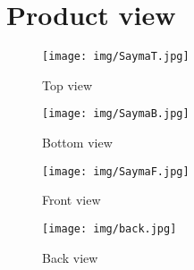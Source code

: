 
\section{Product view}	
	
	\begin{figure}[htbp!]
		\centering
		\texttt{[image: img/SaymaT.jpg]}\\
		\caption{Top view}
	\end{figure}
	
		\begin{figure}[htbp!]
			\centering
			\texttt{[image: img/SaymaB.jpg]}\\
			\caption{Bottom view}
		\end{figure}

		\begin{figure}[htbp!]
			\centering
			\texttt{[image: img/SaymaF.jpg]}\\
			\caption{Front view}
		\end{figure}
	
		\begin{figure}[htbp!]
			\centering
			\texttt{[image: img/back.jpg]}\\
			\caption{Back view}
		\end{figure}
